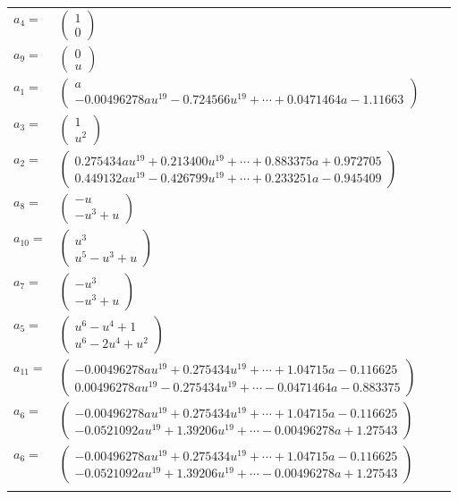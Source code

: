 \documentclass[1p]{elsarticle_modified}
\theoremstyle{definition}
\begin{document}
\begin{tabular}{m{7pt} m{180pt} m{7pt} m{180pt} }
\flushright $a_{4}=$&$\begin{pmatrix}1\\0\end{pmatrix}$ \\
\flushright $a_{9}=$&$\begin{pmatrix}0\\u\end{pmatrix}$ \\
\flushright $a_{1}=$&$\begin{pmatrix}a\\-0.00496278 a u^{19}-0.724566 u^{19}+\cdots+0.0471464 a-1.11663\end{pmatrix}$ \\
\flushright $a_{3}=$&$\begin{pmatrix}1\\u^2\end{pmatrix}$ \\
\flushright $a_{2}=$&$\begin{pmatrix}0.275434 a u^{19}+0.213400 u^{19}+\cdots+0.883375 a+0.972705\\0.449132 a u^{19}-0.426799 u^{19}+\cdots+0.233251 a-0.945409\end{pmatrix}$ \\
\flushright $a_{8}=$&$\begin{pmatrix}- u\\- u^3+u\end{pmatrix}$ \\
\flushright $a_{10}=$&$\begin{pmatrix}u^3\\u^5- u^3+u\end{pmatrix}$ \\
\flushright $a_{7}=$&$\begin{pmatrix}- u^3\\- u^3+u\end{pmatrix}$ \\
\flushright $a_{5}=$&$\begin{pmatrix}u^6- u^4+1\\u^6-2 u^4+u^2\end{pmatrix}$ \\
\flushright $a_{11}=$&$\begin{pmatrix}-0.00496278 a u^{19}+0.275434 u^{19}+\cdots+1.04715 a-0.116625\\0.00496278 a u^{19}-0.275434 u^{19}+\cdots-0.0471464 a-0.883375\end{pmatrix}$ \\
\flushright $a_{6}=$&$\begin{pmatrix}-0.00496278 a u^{19}+0.275434 u^{19}+\cdots+1.04715 a-0.116625\\-0.0521092 a u^{19}+1.39206 u^{19}+\cdots-0.00496278 a+1.27543\end{pmatrix}$\\ \flushright $a_{6}=$&$\begin{pmatrix}-0.00496278 a u^{19}+0.275434 u^{19}+\cdots+1.04715 a-0.116625\\-0.0521092 a u^{19}+1.39206 u^{19}+\cdots-0.00496278 a+1.27543\end{pmatrix}$\\&\end{tabular}
\end{document}

